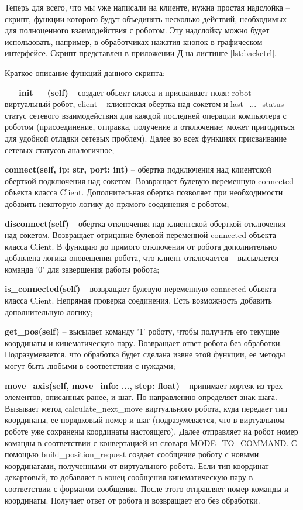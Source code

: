 \documentclass[a4paper,14pt]{extarticle}
\begin{document}
Теперь для всего, что мы уже написали на клиенте, нужна простая надслойка -- скрипт,
функции которого будут объединять несколько действий, необходимых для полноценного взаимодействия
с роботом. Эту надслойку можно будет использовать, например, в обработчиках нажатия кнопок в графическом интерфейсе.
Скрипт представлен в приложении Д на листинге \ref{lst:backctrl}.


Краткое описание функций данного скрипта:
\begin{compactitem}
    \item \textbf{\_\_init\_\_(self)} -- создает объект класса и
    присваивает поля: robot -- виртуальный робот, client -- клиентская
    обертка над сокетом и last\_...\_status -- статус сетевого взаимодействия для каждой
    последней операции компьютера с роботом (присоединение, отправка, получение и отключение;
    может пригодиться для удобной отладки сетевых проблем). Далее во всех функциях присваивание
    сетевых статусов аналогичное;
    \item \textbf{connect(self, ip: str, port: int)} -- обертка подключения над клиентской
    оберткой подключения над сокетом. Возвращает булевую переменную connected объекта класса Client.
    Дополнительная обертка позволяет при необходимости добавить некоторую
    логику до прямого соединения с роботом;
    \item \textbf{disconnect(self)} -- обертка отключения над клиентской
    оберткой отключения над сокетом. Возвращает отрицание булевой переменной connected объекта класса Client.
    В функцию до прямого отключения от робота дополнительно добавлена логика оповещения робота,
    что клиент отключается -- высылается команда '0' для завершения работы робота;
    \item \textbf{is\_connected(self)} -- возвращает булевую переменную connected объекта класса Client.
    Непрямая проверка соединения. Есть возможность добавить дополнительную логику;
    \item \textbf{get\_pos(self)} -- высылает команду '1' роботу, чтобы получить
    его текущие координаты и кинематическую пару. Возвращает ответ робота без обработки.
    Подразумевается, что обработка будет сделана извне этой функции, ее методы могут быть любыми
    в соответствии с нуждами;
    \item \textbf{move\_axis(self, move\_info: ..., step: float)} -- принимает кортеж
    из трех элементов, описанных ранее, и шаг. По направлению определяет знак шага.
    Вызывает метод calculate\_next\_move виртуального робота, куда передает тип координаты,
    ее порядковый номер и шаг (подразумевается, что в виртуальном роботе уже сохранены координаты
    настоящего). Далее отправляет на робот номер команды в соответствии
    с конвертацией из словаря MODE\_TO\_COMMAND. С помощью build\_position\_request
    создает сообщение роботу с новыми координатами, полученными от виртуального робота.
    Если тип координат декартовый, то добавляет в конец сообщения кинематическую пару
    в соответствии с форматом сообщения. После этого отправляет номер команды и координаты.
    Получает ответ от робота и возвращает его без обработки.
\end{compactitem}
\end{document}
